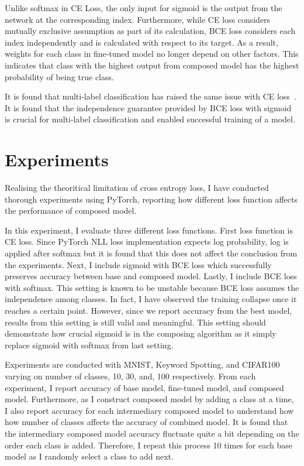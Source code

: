 \documentclass{article}
\begin{document}
Unlike softmax in CE Loss, the only input for sigmoid is the output from the network at the corresponding index. Furthermore, while CE loss considers mutually exclusive assumption as part of its calculation, BCE loss considers each index independently and is calculated with respect to its target. As a result, weights for each class in fine-tuned model no longer depend on other factors. This indicates that class with the highest output from composed model has the highest probability of being true class.

It is found that multi-label classification has raised the same issue with CE loss~\cite{liu2017deep}. It is found that the independence guarantee provided by BCE loss with sigmoid is crucial for multi-label classification and enabled successful training of a model.

\section{Experiments}

Realising the theoritical limitation of cross entropy loss, I have conducted thorough experiments using PyTorch, reporting how different loss function affects the performance of composed model.

In this experiment, I evaluate three different loss functions. First loss function is CE loss. Since PyTorch NLL loss implementation expects log probability, log is applied after softmax but it is found that this does not affect the conclusion from the experiments. Next, I include sigmoid with BCE loss which successfully preserves accuracy between base and composed model. Lastly, I include BCE loss with softmax. This setting is known to be unstable because BCE loss assumes the independence among classes. In fact, I have observed the training collapse once it reaches a certain point. However, since we report accuracy from the best model, results from this setting is still valid and meaningful. This setting should demonstrate how crucial sigmoid is in the composing algorithm as it simply replace sigmoid with softmax from last setting.

Experiments are conducted with MNIST, Keyword Spotting, and CIFAR100 varying on number of classes, 10, 30, and, 100 respectively. From each experiment, I report accuracy of base model, fine-tuned model, and composed model. Furthermore, as I construct composed model by adding a class at a time, I also report accuracy for each intermediary composed model to understand how how number of classes affects the accuracy of combined model. It is found that the intermediary composed model accuracy fluctuate quite a bit depending on the order each class is added. Therefore, I repeat this process 10 times for each base model as I randomly select a class to add next.
\end{document}
